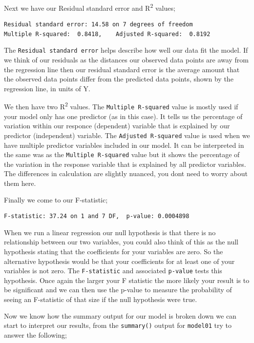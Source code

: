 \documentclass[
]{book}
\begin{document}
Next we have our Residual standard error and R\textsuperscript{2} values;

\begin{verbatim}
Residual standard error: 14.58 on 7 degrees of freedom
Multiple R-squared:  0.8418,    Adjusted R-squared:  0.8192 
\end{verbatim}

The \texttt{Residual\ standard\ error} helps describe how well our data fit the model. If we think of our residuals as the distances our observed data points are away from the regression line then our residual standard error is the average amount that the observed data points differ from the predicted data points, shown by the regression line, in units of Y.

We then have two R\textsuperscript{2} values. The \texttt{Multiple\ R-squared} value is mostly used if your model only has one predictor (as in this case). It tells us the percentage of variation within our responce (dependent) variable that is explained by our predictor (independent) variable. The \texttt{Adjusted\ R-squared} value is used when we have multiple predictor variables included in our model. It can be interpreted in the same was as the \texttt{Multiple\ R-squared} value but it shows the percentage of the variation in the response variable that is explained by all predictor variables. The differences in calculation are slightly nuanced, you dont need to worry about them here.

Finally we come to our F-statistic;

\begin{verbatim}
F-statistic: 37.24 on 1 and 7 DF,  p-value: 0.0004898
\end{verbatim}

When we run a linear regression our null hypothesis is that there is no relationship between our two variables, you could also think of this as the null hypothesis stating that the coefficients for your variables are zero. So the alternative hypothesis would be that your coefficients for at least one of your variables is not zero. The \texttt{F-statistic} and associated \texttt{p-value} tests this hypothesis. Once again the larger your F statistic the more likely your result is to be significant and we can then use the p-value to measure the probability of seeing an F-statistic of that size if the null hypothesis were true.

Now we know how the summary output for our model is broken down we can start to interpret our results, from the \texttt{summary()} output for \texttt{model01} try to answer the following;
\end{document}
